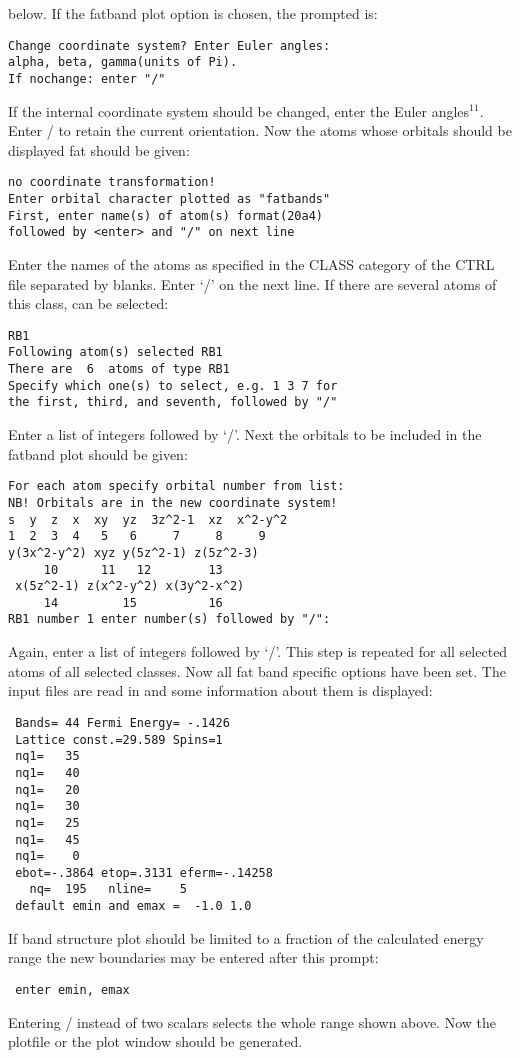 \documentclass[aps,twocolumn,a4]{revtex4}
\begin{document}
below. If the fatband plot option is chosen, the prompted is:
\begin{verbatim}
Change coordinate system? Enter Euler angles:
alpha, beta, gamma(units of Pi).
If nochange: enter "/"
\end{verbatim}
If the internal coordinate system should be changed, enter the Euler
angles$^{11}$.
Enter / to retain the current orientation. Now the atoms
whose orbitals should be displayed fat should be given:
\begin{verbatim}
no coordinate transformation!
Enter orbital character plotted as "fatbands"
First, enter name(s) of atom(s) format(20a4)
followed by <enter> and "/" on next line
\end{verbatim}
Enter the names of the atoms as specified in the CLASS category of the CTRL
file separated by blanks. Enter `/' on the next line. If there are several
atoms of this class, can be selected:
\begin{verbatim}
RB1
Following atom(s) selected RB1
There are  6  atoms of type RB1
Specify which one(s) to select, e.g. 1 3 7 for
the first, third, and seventh, followed by "/"
\end{verbatim}
Enter a list of integers followed by `/'. Next the orbitals
to be included in the fatband plot should be given:
\begin{verbatim}
For each atom specify orbital number from list:
NB! Orbitals are in the new coordinate system!
s  y  z  x  xy  yz  3z^2-1  xz  x^2-y^2
1  2  3  4   5   6     7     8     9
y(3x^2-y^2) xyz y(5z^2-1) z(5z^2-3)
     10      11   12        13
 x(5z^2-1) z(x^2-y^2) x(3y^2-x^2)
     14         15          16
RB1 number 1 enter number(s) followed by "/":
\end{verbatim}
Again, enter a list of integers followed by `/'. This step is repeated for
all selected atoms of all selected classes.
Now all fat band specific options have been set. The input files are read in
and some information about them is displayed:
\begin{verbatim}
 Bands= 44 Fermi Energy= -.1426
 Lattice const.=29.589 Spins=1
 nq1=   35
 nq1=   40
 nq1=   20
 nq1=   30
 nq1=   25
 nq1=   45
 nq1=    0
 ebot=-.3864 etop=.3131 eferm=-.14258
   nq=  195   nline=    5
 default emin and emax =  -1.0 1.0
\end{verbatim}
If band structure plot should be limited to a fraction of the
calculated energy range the new boundaries may be entered after this
prompt:
\begin{verbatim}
 enter emin, emax
\end{verbatim}
Entering / instead of two scalars selects the whole range shown above.
Now the plotfile or the plot window should be generated.\\
\end{document}
